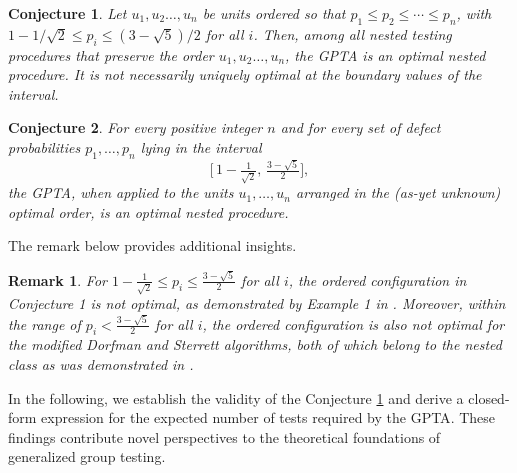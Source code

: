 \documentclass[12pt]{article}
\newtheorem{remark}{Remark}
\newtheorem{cj}{Conjecture}
\begin{document}
\begin{cj}
\label{cj:1}
Let $u_1,u_2\ldots,u_n$ be units ordered so that $p_1\leq p_2\leq \cdots \leq p_n$, with $1-1/\sqrt{2}\leq p_i\leq (3-\sqrt{5})/2$ for all $i$.
Then, among all nested testing procedures that preserve the order $u_1,u_2\ldots,u_n$, the {GPTA} is an optimal nested procedure. It is not necessarily uniquely optimal at the boundary values of the interval.
\end{cj}


\begin{cj}
\label{cj:2}
For every positive integer \( n \) and for every set of defect probabilities \( p_1, \ldots, p_n \) lying in the interval
\[
\bigl[\,1 - \tfrac{1}{\sqrt{2}},\, \tfrac{3 - \sqrt{5}}{2}\bigr],
\]
the {{GPTA}}, when applied to the units \( u_1,\ldots,u_n \) arranged in the (as-yet unknown) optimal order, is an optimal nested procedure.
\end{cj}


\noindent The remark below provides additional insights.
\begin{remark}
For $1 - \frac{1}{\sqrt{2}} \leq p_i \leq \frac{3 - \sqrt{5}}{2}$ for all $i$, the ordered configuration in Conjecture 1 is not optimal, as demonstrated by Example 1 in \cite{M2020}.
Moreover, within the range of $p_i< \frac{3 - \sqrt{5}}{2}$ for all $i$, the ordered configuration is also not optimal for the modified Dorfman and Sterrett \citep{S1957} algorithms, both of which belong to the nested class
as was demonstrated in \cite{M2017}.
\end{remark}




In the following, we establish the validity of the Conjecture \ref{cj:1} and derive a closed-form expression for the expected number of tests required by the {GPTA}. These findings contribute novel perspectives to the theoretical foundations of generalized group testing.
\end{document}

